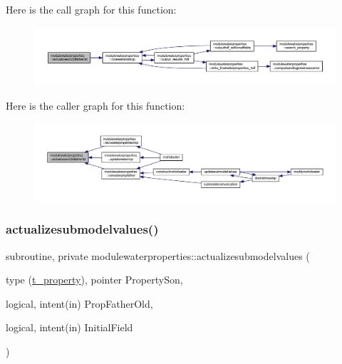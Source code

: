 Here is the call graph for this function\+:\nopagebreak
\begin{figure}[H]
\begin{center}
\leavevmode
\includegraphics[width=350pt]{namespacemodulewaterproperties_a300389c60d61f49a71a655925f38baab_cgraph}
\end{center}
\end{figure}
Here is the caller graph for this function\+:\nopagebreak
\begin{figure}[H]
\begin{center}
\leavevmode
\includegraphics[width=350pt]{namespacemodulewaterproperties_a300389c60d61f49a71a655925f38baab_icgraph}
\end{center}
\end{figure}
\mbox{\label{namespacemodulewaterproperties_a1c0bebcf1f9e3c75094930d29edfdcca}} 
\subsubsection{\texorpdfstring{actualizesubmodelvalues()}{actualizesubmodelvalues()}}
{\footnotesize\ttfamily subroutine, private modulewaterproperties\+::actualizesubmodelvalues (\begin{DoxyParamCaption}\item[{type (\mbox{\hyperlink{structmodulewaterproperties_1_1t__property}{t\+\_\+property}}), pointer}]{Property\+Son,  }\item[{logical, intent(in)}]{Prop\+Father\+Old,  }\item[{logical, intent(in)}]{Initial\+Field }\end{DoxyParamCaption})\hspace{0.3cm}{\ttfamily [private]}}


